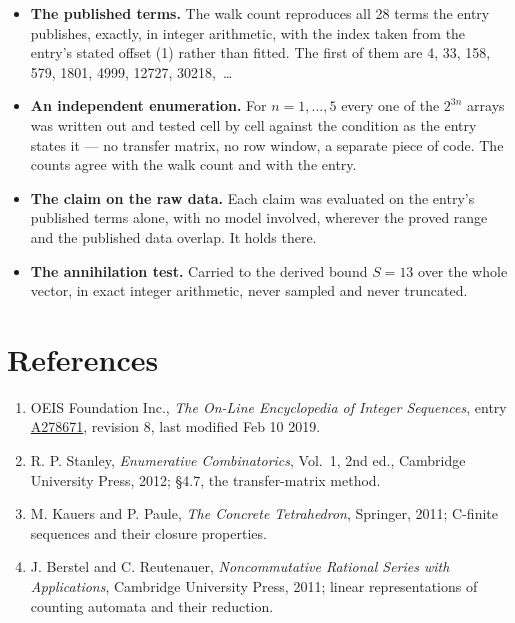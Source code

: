 \documentclass[11pt]{article}
\theoremstyle{definition}
\begin{document}
\begin{itemize}

\item {\bfseries The published terms.} The walk count reproduces all 28 terms the entry publishes, exactly, in integer arithmetic, with the index taken from the entry's stated offset (1) rather than fitted. The first of them are 4, 33, 158, 579, 1801, 4999, 12727, 30218,~\dots

\item {\bfseries An independent enumeration.} For $n = 1,\dots,5$ every one of the $2^{3n}$ arrays was written out and tested cell by cell against the condition as the entry states it --- no transfer matrix, no row window, a separate piece of code. The counts agree with the walk count and with the entry.

\item {\bfseries The claim on the raw data.} Each claim was evaluated on the entry's published terms alone, with no model involved, wherever the proved range and the published data overlap. It holds there.

\item {\bfseries The annihilation test.} Carried to the derived bound $S = 13$ over the whole vector, in exact integer arithmetic, never sampled and never truncated.

\end{itemize}

\section{References}

\begin{enumerate}

\item OEIS Foundation Inc., \emph{The On-Line Encyclopedia of Integer Sequences}, entry \href{https://oeis.org/A278671}{A278671}, revision 8, last modified Feb 10 2019.

\item R. P. Stanley, \emph{Enumerative Combinatorics}, Vol.~1, 2nd ed., Cambridge University Press, 2012; \S4.7, the transfer-matrix method.

\item M. Kauers and P. Paule, \emph{The Concrete Tetrahedron}, Springer, 2011; C-finite sequences and their closure properties.

\item J. Berstel and C. Reutenauer, \emph{Noncommutative Rational Series with Applications}, Cambridge University Press, 2011; linear representations of counting automata and their reduction.

\end{enumerate}
\end{document}
